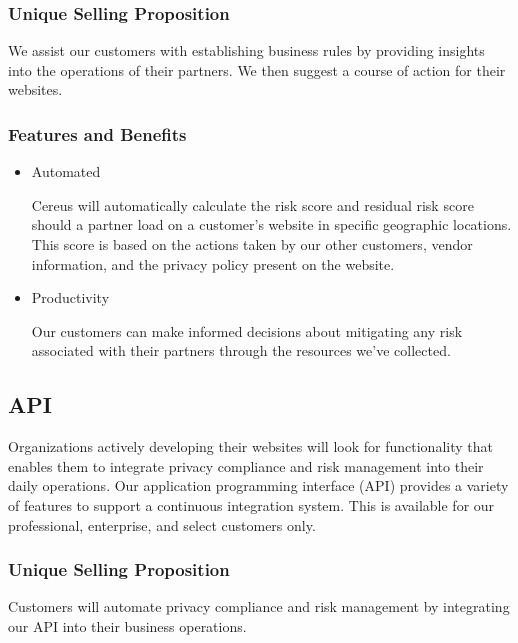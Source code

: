 \subsubsection*{Unique Selling Proposition}

We assist our customers with establishing business rules by providing insights into the operations of their partners. We then suggest a course of action for their websites.

\subsubsection*{Features and Benefits}

\begin{itemize}

\item Automated

Cereus will automatically calculate the risk score and residual risk score should a partner load on a customer's website in specific geographic locations. This score is based on the actions taken by our other customers, vendor information, and the privacy policy present on the website.

\item Productivity

Our customers can make informed decisions about mitigating any risk associated with their partners through the resources we've collected.

\end{itemize}


\subsection{API}

Organizations actively developing their websites will look for functionality that enables them to integrate privacy compliance and risk management into their daily operations. Our application programming interface (API) provides a variety of features to support a continuous integration system. This is available for our professional, enterprise, and select customers only.

\subsubsection*{Unique Selling Proposition}

Customers will automate privacy compliance and risk management by integrating our API into their business operations.

